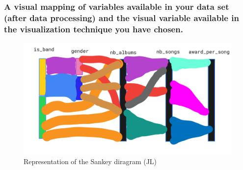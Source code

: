\documentclass{article}
\begin{document}
\subsubsection*{A visual mapping of variables available in your data set (after data processing) and the visual variable available in the visualization technique you have chosen.}

\begin{figure}[h]
    \centering
    \includegraphics[width=.8\textwidth]{Images/sketch_jl.png}
    \caption{Representation of the Sankey diragram (JL)}
\end{figure}
\end{document}

